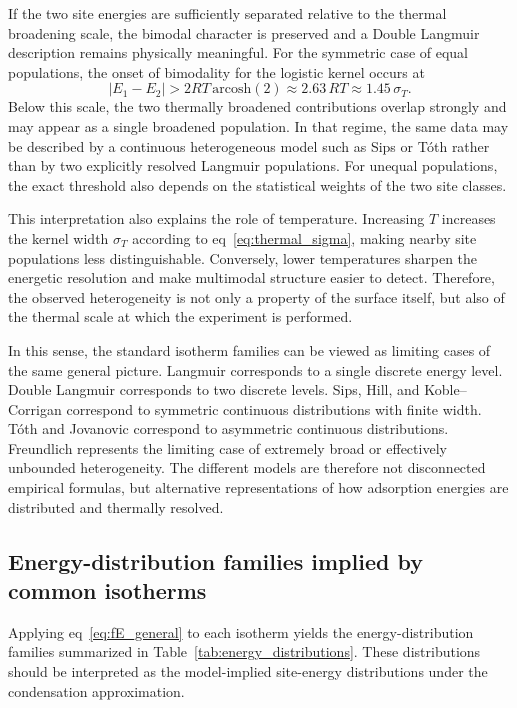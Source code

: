 \documentclass[journal=jacsat,manuscript=article]{achemso}
\begin{document}
	If the two site energies are sufficiently separated relative to the thermal broadening scale, the bimodal character is preserved and a Double Langmuir description remains physically meaningful. For the symmetric case of equal populations, the onset of bimodality for the logistic kernel occurs at
	\begin{equation}
		|E_1-E_2| > 2RT\,\mathrm{arcosh}(2) \approx 2.63\,RT \approx 1.45\,\sigma_T.
	\end{equation}
	Below this scale, the two thermally broadened contributions overlap strongly and may appear as a single broadened population. In that regime, the same data may be described by a continuous heterogeneous model such as Sips or T\'{o}th rather than by two explicitly resolved Langmuir populations. For unequal populations, the exact threshold also depends on the statistical weights of the two site classes.
	
	This interpretation also explains the role of temperature. Increasing $T$ increases the kernel width $\sigma_T$ according to eq~\eqref{eq:thermal_sigma}, making nearby site populations less distinguishable. Conversely, lower temperatures sharpen the energetic resolution and make multimodal structure easier to detect. Therefore, the observed heterogeneity is not only a property of the surface itself, but also of the thermal scale at which the experiment is performed.
	
	In this sense, the standard isotherm families can be viewed as limiting cases of the same general picture. Langmuir corresponds to a single discrete energy level. Double Langmuir corresponds to two discrete levels. Sips, Hill, and Koble--Corrigan correspond to symmetric continuous distributions with finite width. T\'{o}th and Jovanovic correspond to asymmetric continuous distributions. Freundlich represents the limiting case of extremely broad or effectively unbounded heterogeneity. The different models are therefore not disconnected empirical formulas, but alternative representations of how adsorption energies are distributed and thermally resolved.
	
	\subsection{Energy-distribution families implied by common isotherms}
	\label{sec:energy_families}
	
	Applying eq~\eqref{eq:fE_general} to each isotherm yields the energy-distribution families summarized in Table~\ref{tab:energy_distributions}. These distributions should be interpreted as the model-implied site-energy distributions under the condensation approximation.
	
\end{document}
